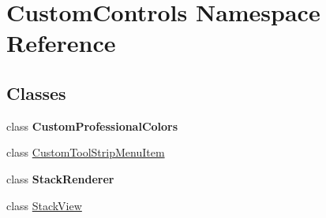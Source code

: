 \hypertarget{namespace_custom_controls}{}\section{Custom\+Controls Namespace Reference}
\label{namespace_custom_controls}
\subsection*{Classes}
\begin{DoxyCompactItemize}
\item 
class {\bfseries Custom\+Professional\+Colors}
\item 
class \hyperlink{class_custom_controls_1_1_custom_tool_strip_menu_item}{Custom\+Tool\+Strip\+Menu\+Item}
\item 
class {\bfseries Stack\+Renderer}
\item 
class \hyperlink{class_custom_controls_1_1_stack_view}{Stack\+View}
\end{DoxyCompactItemize}
